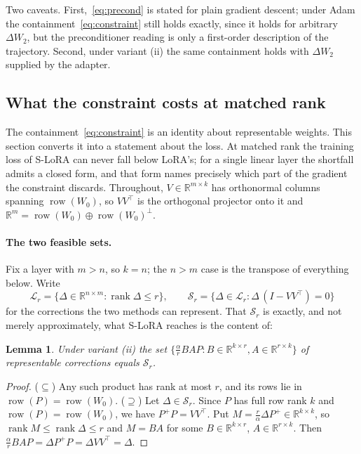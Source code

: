 \documentclass{article}
\newtheorem{lemma}[theorem]{Lemma}
\theoremstyle{remark}
\begin{document}
Two caveats. First,~\eqref{eq:precond} is stated for plain gradient descent;
under Adam the containment~\eqref{eq:constraint} still holds exactly, since it
holds for arbitrary $\Delta W_2$, but the preconditioner reading is only a
first-order description of the trajectory. Second, under variant (ii) the same
containment holds with $\Delta W_2$ supplied by the adapter.

\subsection{What the constraint costs at matched rank}
\label{sec:gap}
The containment~\eqref{eq:constraint} is an identity about representable
weights. This section converts it into a statement about the loss. At matched
rank the training loss of S-LoRA can never fall below LoRA's; for a single
linear layer the shortfall admits a closed form, and that form names precisely
which part of the gradient the constraint discards. Throughout, $V\in
\mathbb{R}^{m\times k}$ has orthonormal columns spanning
$\operatorname{row}(W_0)$, so $VV^{\top}$ is the orthogonal projector onto it
and $\mathbb{R}^{m}=\operatorname{row}(W_0)\oplus\operatorname{row}(W_0)^{\perp}$.

\paragraph{The two feasible sets.}
Fix a layer with $m>n$, so $k=n$; the $n>m$ case is the transpose of everything
below. Write
\begin{equation}
  \mathcal{L}_r=\bigl\{\Delta\in\mathbb{R}^{n\times m}:\operatorname{rank}\Delta\le r\bigr\},
  \qquad
  \mathcal{S}_r=\bigl\{\Delta\in\mathcal{L}_r:\Delta\,(I-VV^{\top})=0\bigr\}
  \label{eq:sets}
\end{equation}
for the corrections the two methods can represent. That $\mathcal{S}_r$ is
exactly, and not merely approximately, what S-LoRA reaches is the content of:

\begin{lemma}\label{lem:exact}
Under variant \textup{(ii)} the set
$\bigl\{\tfrac{\alpha}{r}BAP:B\in\mathbb{R}^{k\times r},A\in\mathbb{R}^{r\times k}\bigr\}$
of representable corrections equals $\mathcal{S}_r$.
\end{lemma}

\begin{proof}
($\subseteq$) Any such product has rank at most $r$, and its rows lie in
$\operatorname{row}(P)=\operatorname{row}(W_0)$.
($\supseteq$) Let $\Delta\in\mathcal{S}_r$. Since $P$ has full row rank $k$ and
$\operatorname{row}(P)=\operatorname{row}(W_0)$, we have $P^{+}P=VV^{\top}$. Put
$M=\tfrac{r}{\alpha}\Delta P^{+}\in\mathbb{R}^{k\times k}$, so
$\operatorname{rank}M\le\operatorname{rank}\Delta\le r$ and $M=BA$ for some
$B\in\mathbb{R}^{k\times r}$, $A\in\mathbb{R}^{r\times k}$. Then
$\tfrac{\alpha}{r}BAP=\Delta P^{+}P=\Delta VV^{\top}=\Delta$.
\end{proof}
\end{document}
